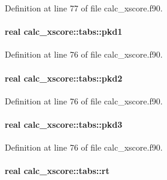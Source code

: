 Definition at line 77 of file calc\-\_\-xscore.\-f90.

\hypertarget{structcalc__xscore_1_1tabs_af974dc5008391f1c728a37faa01ff16a}{
\paragraph[{pkd1}]{\setlength{\rightskip}{0pt plus 5cm}real calc\-\_\-xscore\-::tabs\-::pkd1}}\label{structcalc__xscore_1_1tabs_af974dc5008391f1c728a37faa01ff16a}


Definition at line 76 of file calc\-\_\-xscore.\-f90.

\hypertarget{structcalc__xscore_1_1tabs_a7ea61af1d13d5f701a81b81256bc460d}{
\paragraph[{pkd2}]{\setlength{\rightskip}{0pt plus 5cm}real calc\-\_\-xscore\-::tabs\-::pkd2}}\label{structcalc__xscore_1_1tabs_a7ea61af1d13d5f701a81b81256bc460d}


Definition at line 76 of file calc\-\_\-xscore.\-f90.

\hypertarget{structcalc__xscore_1_1tabs_a59d2e28084a9183a06b692db0f23cf4f}{
\paragraph[{pkd3}]{\setlength{\rightskip}{0pt plus 5cm}real calc\-\_\-xscore\-::tabs\-::pkd3}}\label{structcalc__xscore_1_1tabs_a59d2e28084a9183a06b692db0f23cf4f}


Definition at line 76 of file calc\-\_\-xscore.\-f90.

\hypertarget{structcalc__xscore_1_1tabs_aa3ea7bf40c30a9cfbc0f785297a320b5}{
\paragraph[{rt}]{\setlength{\rightskip}{0pt plus 5cm}real calc\-\_\-xscore\-::tabs\-::rt}}\label{structcalc__xscore_1_1tabs_aa3ea7bf40c30a9cfbc0f785297a320b5}


